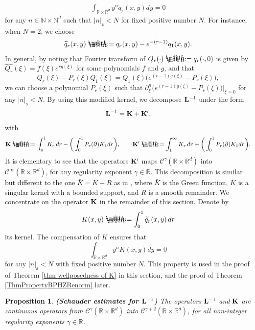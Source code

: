 \documentclass[10pt, reqno]{amsart}
\makeatletter
\numberwithin{subsection}{section}
\numberwithin{subsubsection}{subsection}
\numberwithin{equation}{section} %
\theoremstyle{mystyle}
\newtheorem{prop}[thm]{\hspace{-0.13cm} {Proposition}}%
\theoremstyle{mystyle2}
\theoremstyle{mystyle3}
\newcommand\bbN{\mathbb{N}}
\newcommand\bbR{\mathbb{R}}
\newcommand{\mcC}{\mathcal{C}}
\newcommand*{\defeq}{\mathrel{\rlap{%
                     \raisebox{0.3ex}{$\m@th\cdot$}}%
                     \raisebox{-0.3ex}{$\m@th\cdot$}}%
                     =}
\makeatother
\begin{document}
\begin{align}\label{eq: integral of K vanishes}
\int_{\bbR\times\bbR^d}y^n\widetilde{q}_r(x,y)dy=0
\end{align}
for any $n\in\bbN\times\bbN^d$ such that $|n|_{\mathfrak{s}}<N$ for fixed positive number $N$.
For instance, when $N=2$, we choose
$$
\widetilde{q}_r(x,y)\defeq q_r(x,y)-e^{-(r-1)}q_1(x,y).
$$
In general, by noting that Fourier transform of $Q_r(\cdot)\defeq q_r(\cdot,0)$ is given by $\widehat{Q_r}(\xi)=f(\xi)e^{rg(\xi)}$ for some polynomials $f$ and $g$, and that
$$
Q_r(\xi)-P_r(\xi)Q_1(\xi)=Q_1(\xi)\big(e^{(r-1)g(\xi)}-P_r(\xi)\big),
$$
we can choose a polynomial $P_r(\xi)$ such that $\partial_\xi^n\big(e^{(r-1)g(\xi)}-P_r(\xi)\big)\vert_{\xi=0}$ for any $|n|_{\mathfrak{s}}<N$.
By using this modified kernel, we decompose ${\bf L}^{-1}$ under the form
$$
{\bf L}^{-1} = {\bf K}+{\bf K}',
$$ 
with
\begin{align}\label{section 3: decomposition of K into K_r}
{\bf K} \defeq  \int_0^1K_r\,dr-\bigg(\int_0^1P_r(\partial)K_1dr\bigg),\qquad {\bf K}' \defeq  \int_1^\infty K_r\,dr+\bigg(\int_0^1P_r(\partial)K_1dr\bigg).
\end{align}
It is elementary to see that the operators ${\bf K}'$ maps $\mcC^\gamma(\bbR\times\bbR^d)$ into $\mcC^\infty(\bbR\times\bbR^d)$, for any regularity exponent $\gamma\in\bbR$. This decomposition is similar but different to the one $\bar{K}=K+R$ as in \cite[Lemma 5.5]{Hai14}, where $\bar{K}$ is the Green function, $K$ is a singular kernel with a bounded support, and $R$ is a smooth remainder. We concentrate on the operator ${\bf K}$ in the remainder of this section. 
Denote by 
\begin{align}\label{section 3: decomposition of K into q_r}
K(x,y) \defeq  \int_0^1 \widetilde{q}_r(x,y)\,dr
\end{align}
its kernel. The compensation of $K$ ensures that
$$
\int_{\bbR\times\bbR^d}y^nK(x,y)dy=0
$$
for any $|n|_{\mathfrak{s}}<N$ with fixed positive number $N$. This property is used in the proof of Theorem \ref{thm wellposedness of K} in this section, and the proof of Theorem \ref{ThmPropertyBPHZRenorm} later.

\medskip

\begin{prop} \label{PropSchauderEstimates}
\textsf{\textbf{(Schauder estimates for ${\bf L}^{-1}$)}} The operators ${\bf L}^{-1}$ and $\bf K$ are continuous operators from $\mcC^\gamma(\bbR\times\bbR^d)$ into $\mcC^{\gamma+2}(\bbR\times\bbR^d)$, for all non-integer regularity exponents $\gamma\in\bbR$. 
\end{prop}
\end{document}
